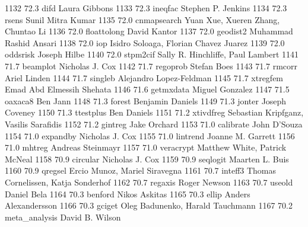   1132     72.3    difd          Laura Gibbons                           
  1133     72.3    ineqfac       Stephen P. Jenkins                      
  1134     72.3    rsens         Sunil Mitra Kumar                       
  1135     72.0    cnmapsearch   Yuan Xue, Xueren Zhang, Chuntao Li      
  1136     72.0    floattolong   David Kantor                            
  1137     72.0    geodist2      Muhammad Rashid Ansari                  
  1138     72.0    iop           Isidro Soloaga, Florian Chavez Juarez   
  1139     72.0    oddsrisk      Joseph Hilbe                            
  1140     72.0    stpm2cif      Sally R. Hinchliffe, Paul Lambert       
  1141     71.7    beamplot      Nicholas J. Cox                         
  1142     71.7    regoprob      Stefan Boes                             
  1143     71.7    rmcorr        Ariel Linden                            
  1144     71.7    singleb       Alejandro Lopez-Feldman                 
  1145     71.7    xtregfem      Emad Abd Elmessih Shehata               
  1146     71.6    getmxdata     Miguel Gonzalez                         
  1147     71.5    oaxaca8       Ben Jann                                
  1148     71.3    forest        Benjamin Daniels                        
  1149     71.3    jonter        Joseph Coveney                          
  1150     71.3    ttestplus     Ben Daniels                             
  1151     71.2    xtivdfreg     Sebastian Kripfganz, Vasilis Sarafidis  
  1152     71.2    gintreg       Jake Orchard                            
  1153     71.0    calibrate     John D'Souza                            
  1154     71.0    expandby      Nicholas J. Cox                         
  1155     71.0    lintrend      Joanne M. Garrett                       
  1156     71.0    mhtreg        Andreas Steinmayr                       
  1157     71.0    veracrypt     Matthew White, Patrick McNeal           
  1158     70.9    circular      Nicholas J. Cox                         
  1159     70.9    seqlogit      Maarten L. Buis                         
  1160     70.9    qregsel       Ercio Munoz, Mariel Siravegna           
  1161     70.7    inteff3       Thomas Cornelissen, Katja Sonderhof     
  1162     70.7    regaxis       Roger Newson                            
  1163     70.7    useold        Daniel Bela                             
  1164     70.3    benford       Nikos Askitas                           
  1165     70.3    ellip         Anders Alexandersson                    
  1166     70.3    gciget        Oleg Badunenko, Harald Tauchmann        
  1167     70.2    meta_analysis  David B. Wilson                         
